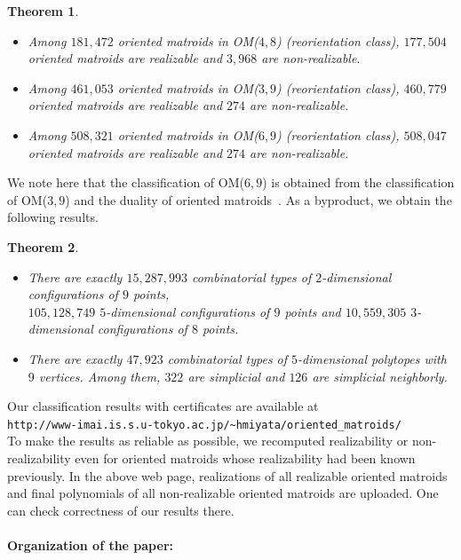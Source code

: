 \documentclass{article}
\newtheorem{thm}{Theorem}[section]
\begin{document}
\begin{thm}~\mbox{}
\label{realizability result}
\begin{itemize}
\item[{\rm (a)}] Among $181,472$ oriented matroids in OM($4,8$) (reorientation class), $177,504$ oriented matroids 
are realizable and $3,968$ are non-realizable.
\item[{\rm (b)}] Among $461,053$ oriented matroids in OM($3,9$) (reorientation class), $460,779$ oriented matroids
are realizable and $274$ are non-realizable.
\item[{\rm (c)}] Among $508,321$ oriented matroids in OM($6,9$) (reorientation class), $508,047$ oriented matroids
are realizable and $274$ are non-realizable.
\end{itemize}
\end{thm}
We note here that the classification of OM($6,9$) is obtained from the classification of OM($3,9$) and the duality of oriented matroids~\cite{BLSWZ99}.
As a byproduct, we obtain the following results.
\begin{thm}~\mbox{}
\label{point configurations polytopes}
\begin{itemize}
\item[{\rm (a)}] There are exactly $15,287,993$ combinatorial types of 
$2$-dimensional configurations of $9$ points, \\$105,128,749$ $5$-dimensional configurations of $9$ points and 
$10,559,305$ $3$-dimensional configurations of $8$ points.
\item[{\rm (b)}] There are exactly $47,923$ combinatorial types of $5$-dimensional polytopes with $9$ vertices.
Among them, $322$ are simplicial and $126$ are simplicial neighborly.
\end{itemize}
\end{thm}
Our classification results with certificates are available at\\
{\tt http://www-imai.is.s.u-tokyo.ac.jp/\~{}hmiyata/oriented\_matroids/}\\
To make the results as reliable as possible, 
we recomputed realizability or non-realizability even for oriented matroids 
whose realizability had been known previously.
In the above web page, realizations of all realizable oriented matroids and final polynomials of all non-realizable oriented matroids are uploaded.
One can check correctness of our results there.
\\  
\\
{\bf Organization of the paper:}\\
\end{document}

